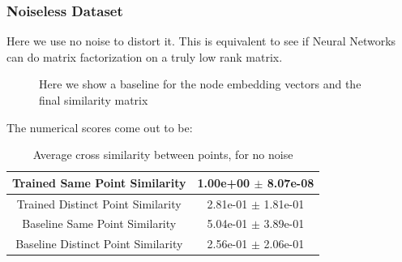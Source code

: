 \documentclass[a4paper]{article}
\begin{document}
\subsubsection*{Noiseless Dataset}
Here we use no noise to distort it.
This is equivalent to see if Neural Networks can do matrix factorization on a truly low rank matrix.
\begin{figure}[H]
    \centering
    \caption{Here we show a baseline for the node embedding vectors and the final similarity matrix}
    \label{fig:noiseless_plot}
\end{figure}
The numerical scores come out to be:
\begin{table}[H]
    \centering
    \begin{tabular}{|c|c|} \hline
        Trained Same Point Similarity      & 1.00e+00 $\pm$ 8.07e-08  \\ \hline
        Trained Distinct Point Similarity  & 2.81e-01 $\pm$ 1.81e-01  \\ \hline
        Baseline Same Point Similarity     & 5.04e-01 $\pm$ 3.89e-01  \\ \hline
        Baseline Distinct Point Similarity & 2.56e-01 $\pm$ 2.06e-01  \\ \hline
    \end{tabular}
    \caption{Average cross similarity between points, for no noise}
    \label{tab:noiseless_table}
\end{table}
\end{document}
